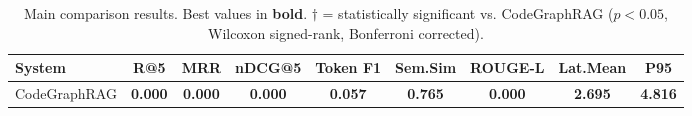 \begin{table}[t]
\centering
\caption{Main comparison results. Best values in \textbf{bold}. 
$\dagger$ = statistically significant vs. CodeGraphRAG ($p < 0.05$, Wilcoxon signed-rank, Bonferroni corrected).}
\begin{tabular}{lcccccccc}
\toprule
System & R@5 & MRR & nDCG@5 & Token F1 & Sem.Sim & ROUGE-L & Lat.Mean & P95 \\
\midrule
CodeGraphRAG & \textbf{0.000} & \textbf{0.000} & \textbf{0.000} & \textbf{0.057} & \textbf{0.765} & \textbf{0.000} & \textbf{2.695} & \textbf{4.816} \\
\bottomrule
\end{tabular}
\end{table}
